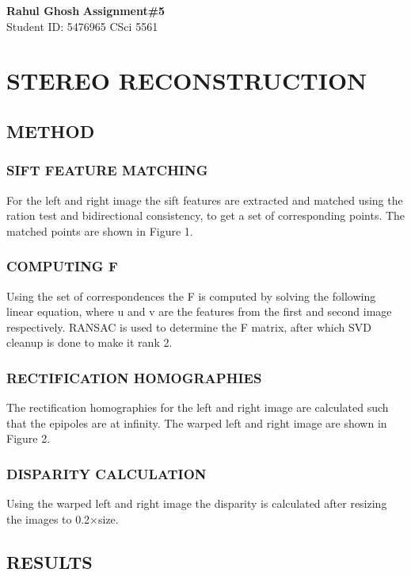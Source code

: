 \documentclass[letter, 10pt]{article}
\begin{document}
\noindent
\large \textbf{Rahul Ghosh} \hfill \textbf{Assignment\#5}\\
\normalsize Student ID: 5476965 \hfill CSci 5561\\

\section*{\centering STEREO RECONSTRUCTION}

\subsection*{METHOD}
\subsubsection*{SIFT FEATURE MATCHING}
For the left and right image the sift features are extracted and matched using the ration test and bidirectional consistency, to get a set of corresponding points. The matched points are shown in Figure 1.

\subsubsection*{COMPUTING F}
Using the set of correspondences the F is computed by solving the following linear equation, where u and v are the features from the first and second image respectively. RANSAC is used to determine the F matrix, after which SVD cleanup is done to make it rank 2. 

\subsubsection*{RECTIFICATION HOMOGRAPHIES}
The rectification homographies for the left and right image are calculated such that the epipoles are at infinity. The warped left and right image are shown in Figure 2.

\subsubsection*{DISPARITY CALCULATION}
Using the warped left and right image the disparity is calculated after resizing the images to 0.2$\times$size.

\subsection*{RESULTS}
\end{document}

